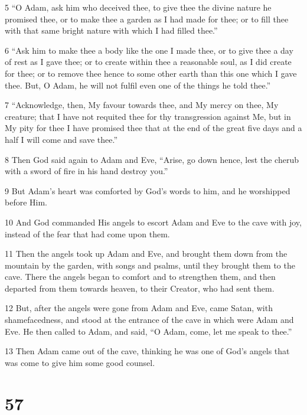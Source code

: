 \par 5 “O Adam, ask him who deceived thee, to give thee the divine nature he promised thee, or to make thee a garden as I had made for thee; or to fill thee with that same bright nature with which I had filled thee.”

\par 6 “Ask him to make thee a body like the one I made thee, or to give thee a day of rest as I gave thee; or to create within thee a reasonable soul, as I did create for thee; or to remove thee hence to some other earth than this one which I gave thee. But, O Adam, he will not fulfil even one of the things he told thee.”

\par 7 “Acknowledge, then, My favour towards thee, and My mercy on thee, My creature; that I have not requited thee for thy transgression against Me, but in My pity for thee I have promised thee that at the end of the great five days and a half I will come and save thee.”

\par 8 Then God said again to Adam and Eve, “Arise, go down hence, lest the cherub with a sword of fire in his hand destroy you.”

\par 9 But Adam's heart was comforted by God's words to him, and he worshipped before Him.

\par 10 And God commanded His angels to escort Adam and Eve to the cave with joy, instead of the fear that had come upon them.

\par 11 Then the angels took up Adam and Eve, and brought them down from the mountain by the garden, with songs and psalms, until they brought them to the cave. There the angels began to comfort and to strengthen them, and then departed from them towards heaven, to their Creator, who had sent them.

\par 12 But, after the angels were gone from Adam and Eve, came Satan, with shamefacedness, and stood at the entrance of the cave in which were Adam and Eve. He then called to Adam, and said, “O Adam, come, let me speak to thee.”

\par 13 Then Adam came out of the cave, thinking he was one of God's angels that was come to give him some good counsel.

\chapter{57}

